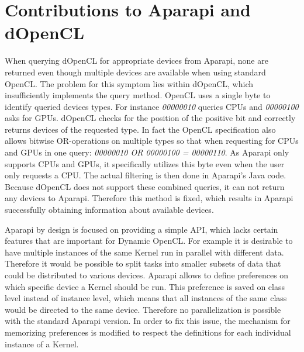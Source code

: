\section*{Contributions to Aparapi and dOpenCL}
\begin{description}[style=nextline]
	\item [No available devices]
	When querying dOpenCL for appropriate devices from Aparapi, none are returned even though multiple devices are available when using standard OpenCL. The problem for this symptom lies within dOpenCL, which insufficiently implements the query method. OpenCL uses a single byte to identify queried devices types. For instance \textit{00000010} queries CPUs and \textit{00000100} asks for GPUs. dOpenCL checks for the position of the positive bit and correctly returns devices of the requested type. In fact the OpenCL specification also allows bitwise OR-operations on multiple types so that when requesting for CPUs and GPUs in one query: \textit{00000010 OR 00000100 = 00000110}. As Aparapi only supports CPUs and GPUs, it specifically utilizes this byte even when the user only requests a CPU. The actual filtering is then done in Aparapi's Java code. Because dOpenCL does not support these combined queries, it can not return any devices to Aparapi. Therefore this method is fixed, which results in Aparapi successfully obtaining information about available devices.

	\item [Specific device choice]
	Aparapi by design is focused on providing a simple API, which lacks certain features that are important for Dynamic OpenCL. For example it is desirable to have multiple instances of the same Kernel run in parallel with different data. Therefore it would be possible to split tasks into smaller subsets of data that could be distributed to various devices. Aparapi allows to define preferences on which specific device a Kernel should be run. This preference is saved on class level instead of instance level, which means that all instances of the same class would be directed to the same device. Therefore no parallelization is possible with the standard Aparapi version. In order to fix this issue, the mechanism for memorizing preferences is modified to respect the definitions for each individual instance of a Kernel.


\end{description}
